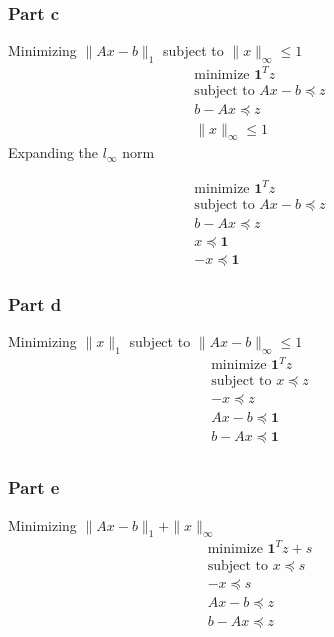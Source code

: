 \subsubsection{Part c}
Minimizing $\| Ax-b \|_1$ subject to $\| x \|_\infty \leq 1$
\begin{equation}
  \begin{aligned}
    \text{minimize } \textbf{1}^T z \\ 
    \text{subject to } A x - b \preceq z\\
    b - A x \preceq z \\
    \| x \|_\infty \leq 1
  \end{aligned}
\end{equation}
Expanding the $l_\infty$ norm

\begin{equation}
  \begin{aligned}
    \text{minimize } \textbf{1}^T z \\ 
    \text{subject to } A x - b \preceq z\\
    b - A x \preceq z \\
    x  \preceq \textbf{1} \\
    -x \preceq \textbf{1}
  \end{aligned}
\end{equation}

\subsubsection{Part d}
Minimizing $\| x \|_1$ subject to $\| Ax -b \|_\infty \leq 1$
\begin{equation}
  \begin{aligned}
    \text{minimize } \textbf{1}^T z \\ 
    \text{subject to } x \preceq z\\
    - x \preceq z \\
    A x - b \preceq \textbf{1}\\
    b - A x \preceq \textbf{1}\\
  \end{aligned}
\end{equation}

\subsubsection{Part e}
Minimizing $\| Ax-b \|_1 + \| x \|_\infty$
\begin{equation}
  \begin{aligned}
    \text{minimize } \textbf{1}^T z + s \\ 
    \text{subject to } x \preceq s\\
    - x \preceq s \\
    A x - b \preceq z\\
    b - A x \preceq z\\
  \end{aligned}
\end{equation}



